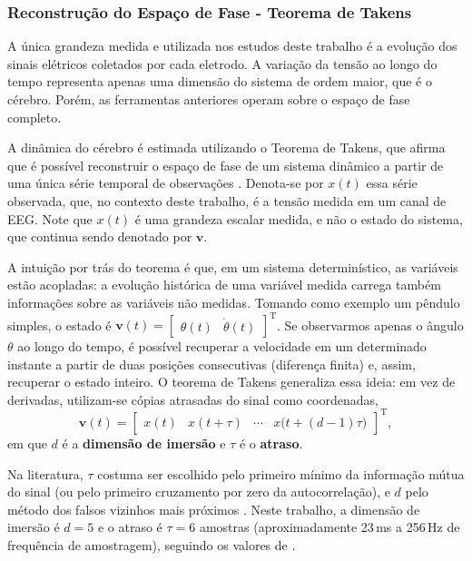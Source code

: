 \documentclass[]{article}
\begin{document}
	\subsubsection{Reconstrução do Espaço de Fase - Teorema de Takens}
	\label{subsubsec:takens}
	\noindent

	A única grandeza medida e utilizada nos estudos deste trabalho é a evolução dos sinais elétricos coletados por cada eletrodo. A variação da tensão ao longo do tempo representa apenas uma dimensão do sistema de ordem maior, que é o cérebro. Porém, as ferramentas anteriores operam sobre o espaço de fase completo.

	A dinâmica do cérebro é estimada utilizando o Teorema de Takens, que afirma que é possível reconstruir o espaço de fase de um sistema dinâmico a partir de uma única série temporal de observações \cite{takens1981detecting}. Denota-se por $x(t)$ essa série observada, que, no contexto deste trabalho, é a tensão medida em um canal de EEG. Note que $x(t)$ é uma grandeza escalar medida, e não o estado do sistema, que continua sendo denotado por $\mathbf{v}$.

	A intuição por trás do teorema é que, em um sistema determinístico, as variáveis estão acopladas: a evolução histórica de uma variável medida carrega também informações sobre as variáveis não medidas. Tomando como exemplo um pêndulo simples, o estado é $\mathbf{v}(t) = \begin{bmatrix} \theta(t) & \dot{\theta}(t) \end{bmatrix}^{\mathrm{T}}$. Se observarmos apenas o ângulo $\theta$ ao longo do tempo, é possível recuperar a velocidade em um determinado instante a partir de duas posições consecutivas (diferença finita) e, assim, recuperar o estado inteiro. O teorema de Takens generaliza essa ideia: em vez de derivadas, utilizam-se cópias atrasadas do sinal como coordenadas,
	\begin{equation}
		\mathbf{v}(t) = \begin{bmatrix} x(t) & x(t + \tau) & \cdots & x\big(t + (d - 1)\tau\big) \end{bmatrix}^{\mathrm{T}},
	\end{equation}
	em que $d$ é a \textbf{dimensão de imersão} e $\tau$ é o \textbf{atraso}.

	Na literatura, $\tau$ costuma ser escolhido pelo primeiro mínimo da informação mútua do sinal \cite{fraser1986independent} (ou pelo primeiro cruzamento por zero da autocorrelação), e $d$ pelo método dos falsos vizinhos mais próximos \cite{kennel1992determining}. Neste trabalho, a dimensão de imersão é $d = 5$ e o atraso é $\tau = 6$ amostras (aproximadamente 23\,ms a 256\,Hz de frequência de amostragem), seguindo os valores de \cite{zabihi2015analysis}.
\end{document}
